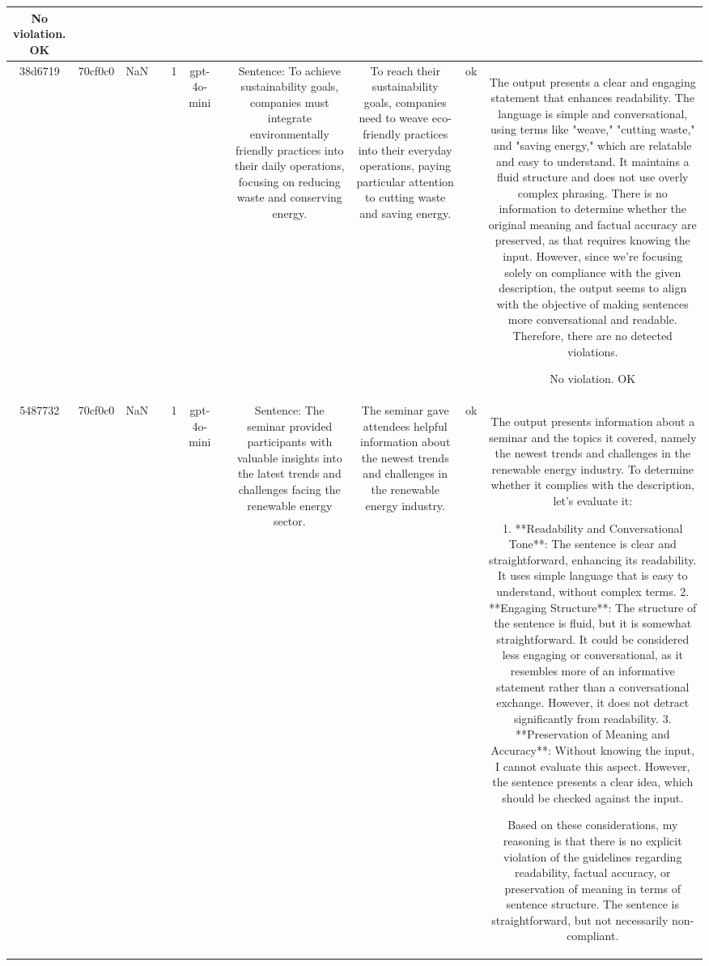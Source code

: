\begin{table}[h!]
\begin{tabular}{|c|c|c|c|c|c|c|c|c|c|c|}
No violation.
OK\\
\hline
38d6719 & 70cf0c0 & NaN &  & 1 & gpt-4o-mini &  & Sentence: To achieve sustainability goals, companies must integrate environmentally friendly practices into their daily operations, focusing on reducing waste and conserving energy. & To reach their sustainability goals, companies need to weave eco-friendly practices into their everyday operations, paying particular attention to cutting waste and saving energy. & ok & The output presents a clear and engaging statement that enhances readability. The language is simple and conversational, using terms like "weave," "cutting waste," and "saving energy," which are relatable and easy to understand. It maintains a fluid structure and does not use overly complex phrasing. There is no information to determine whether the original meaning and factual accuracy are preserved, as that requires knowing the input. However, since we're focusing solely on compliance with the given description, the output seems to align with the objective of making sentences more conversational and readable. Therefore, there are no detected violations.

No violation.
OK\\
\hline
5487732 & 70cf0c0 & NaN &  & 1 & gpt-4o-mini &  & Sentence: The seminar provided participants with valuable insights into the latest trends and challenges facing the renewable energy sector. & The seminar gave attendees helpful information about the newest trends and challenges in the renewable energy industry. & ok & The output presents information about a seminar and the topics it covered, namely the newest trends and challenges in the renewable energy industry. To determine whether it complies with the description, let's evaluate it:

1. **Readability and Conversational Tone**: The sentence is clear and straightforward, enhancing its readability. It uses simple language that is easy to understand, without complex terms.
2. **Engaging Structure**: The structure of the sentence is fluid, but it is somewhat straightforward. It could be considered less engaging or conversational, as it resembles more of an informative statement rather than a conversational exchange. However, it does not detract significantly from readability.
3. **Preservation of Meaning and Accuracy**: Without knowing the input, I cannot evaluate this aspect. However, the sentence presents a clear idea, which should be checked against the input.

Based on these considerations, my reasoning is that there is no explicit violation of the guidelines regarding readability, factual accuracy, or preservation of meaning in terms of sentence structure. The sentence is straightforward, but not necessarily non-compliant.


\end{tabular}
\end{table}
